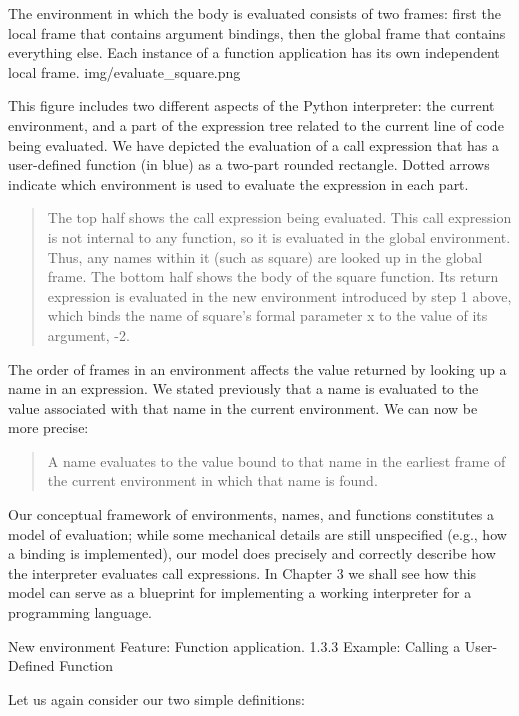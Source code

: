 \documentclass[letterpaper,10pt,dvipdfmx]{sphinxmanual}
\begin{document}
The environment in which the body is evaluated consists of two frames: first the local frame that contains argument bindings, then the global frame that contains everything else. Each instance of a function application has its own independent local frame.
img/evaluate\_square.png

This figure includes two different aspects of the Python interpreter: the current environment, and a part of the expression tree related to the current line of code being evaluated. We have depicted the evaluation of a call expression that has a user-defined function (in blue) as a two-part rounded rectangle. Dotted arrows indicate which environment is used to evaluate the expression in each part.
\begin{quote}

The top half shows the call expression being evaluated. This call expression is not internal to any function, so it is evaluated in the global environment. Thus, any names within it (such as square) are looked up in the global frame.
The bottom half shows the body of the square function. Its return expression is evaluated in the new environment introduced by step 1 above, which binds the name of square's formal parameter x to the value of its argument, -2.
\end{quote}

The order of frames in an environment affects the value returned by looking up a name in an expression. We stated previously that a name is evaluated to the value associated with that name in the current environment. We can now be more precise:
\begin{quote}

A name evaluates to the value bound to that name in the earliest frame of the current environment in which that name is found.
\end{quote}

Our conceptual framework of environments, names, and functions constitutes a model of evaluation; while some mechanical details are still unspecified (e.g., how a binding is implemented), our model does precisely and correctly describe how the interpreter evaluates call expressions. In Chapter 3 we shall see how this model can serve as a blueprint for implementing a working interpreter for a programming language.

New environment Feature: Function application.
1.3.3   Example: Calling a User-Defined Function

Let us again consider our two simple definitions:
\end{document}
